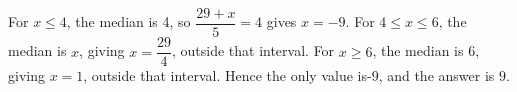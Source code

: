 For $x\le4$, the median is 4, so $\dfrac{29+x}{5}=4$ gives $x=-9$. For $4\le x\le6$, the median is $x$, giving $x=\dfrac{29}{4}$, outside that interval. For $x\ge6$, the median is 6, giving $x=1$, outside that interval. Hence the only value is-9, and the answer is $\boxed9$.
